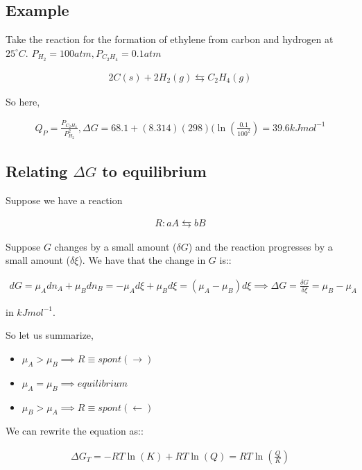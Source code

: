\documentclass[12pt]{book}
\begin{document}
\subsection*{Example}

Take the reaction for the formation of ethylene from carbon and hydrogen at $25^{\circ}C$. $P_{H_2}=100atm, P_{C_2H_4}=0.1atm$

\begin{align*}
    2C(s)+2H_2(g)\leftrightarrows C_2H_4(g)
\end{align*}

So here,

\begin{align*}
    Q_P=\frac{P_{C_2H_4}}{P_{H_2}^2}, \Delta G=68.1+(8.314)(298)(\ln\left(\frac{0.1}{100^2}\right)=39.6 kJmol^{-1}
\end{align*}

\subsection*{Relating $\Delta G$ to equilibrium}

Suppose we have a reaction

\begin{align*}
    R:aA\leftrightarrows bB
\end{align*}

Suppose $G$ changes by a small amount ($\delta G$) and the reaction progresses by a small amount ($\delta \xi$). We have that the change in $G$ is::

\begin{align*}
    dG=\mu_A dn_A+\mu_B dn_B=-\mu_A d\xi +\mu_B d\xi=(\mu_A-\mu_B)d\xi\implies \Delta G=\frac{\delta G}{\delta \xi}=\mu_B-\mu_A
\end{align*}

in $kJmol^{-1}$.

So let us summarize,

\begin{itemize}
    \item $\mu_A>\mu_B\implies R\equiv spont(\rightarrow)$
    \item $\mu_A=\mu_B\implies equilibrium$
    \item $\mu_B>\mu_A\implies R\equiv spont(\leftarrow)$
\end{itemize}

We can rewrite the equation as::

\begin{align*}
    \Delta G_T=-RT\ln(K)+RT\ln(Q)=RT\ln\left(\frac{Q}{K}\right)
\end{align*}
\end{document}
